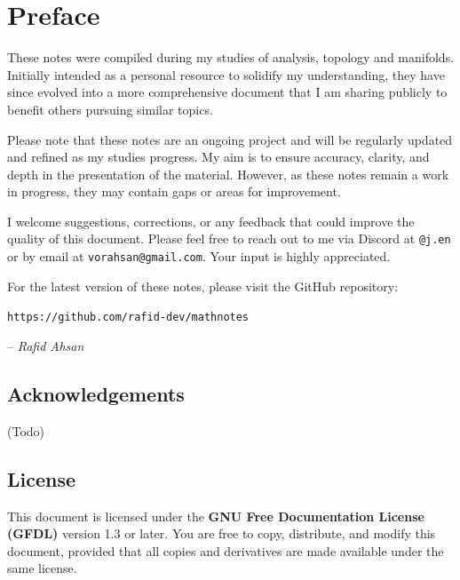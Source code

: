 
\chapter*{Preface}

These notes were compiled during my studies of analysis, topology and manifolds. Initially intended as a personal resource to solidify my understanding, they have since evolved into a more comprehensive document that I am sharing publicly to benefit others pursuing similar topics.

Please note that these notes are an ongoing project and will be regularly updated and refined as my studies progress. My aim is to ensure accuracy, clarity, and depth in the presentation of the material. However, as these notes remain a work in progress, they may contain gaps or areas for improvement.

I welcome suggestions, corrections, or any feedback that could improve the quality of this document. Please feel free to reach out to me via Discord at \texttt{@j.en} or by email at \texttt{vorahsan@gmail.com}. Your input is highly appreciated.

For the latest version of these notes, please visit the GitHub repository:
\begin{center}
\texttt{https://github.com/rafid-dev/mathnotes}
\end{center}

\vspace{1cm}
\hfill -- \textit{Rafid Ahsan}

\section*{Acknowledgements}
(Todo)

\clearpage

\section*{License}

This document is licensed under the \textbf{GNU Free Documentation License (GFDL)} version 1.3 or later. You are free to copy, distribute, and modify this document, provided that all copies and derivatives are made available under the same license.

